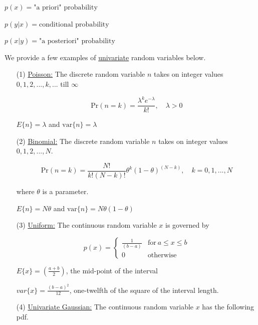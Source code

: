 \documentclass[fleqn]{article}
\begin{document}
	$p(x) = \text{"a priori" probability}$
	
	$p(y|x) = \text{conditional probability}$
	
	$p(x|y) = \text{"a posteriori" probability}$
	
	We provide a few examples of \underline{univariate} random variables below.
	
	\begin{enumerate}
		\item[(1)] \underline{Poisson:} The discrete random variable $n$ takes on integer values \newline $0,1,2,...,k,...$ till $\infty$
		
		\begin{equation*}
			\text{Pr}(n = k) = \frac{\lambda^k e^{-\lambda}}{k!},\quad\lambda > 0
		\end{equation*}
		
		$E\{n\} = \lambda$ and $\text{var}\{n\} = \lambda$
		
		\item[(2)] \underline{Binomial:} The discrete random variable $n$ takes on integer values \newline $0,1,2,...,N$.
		
		\begin{equation*}
			\text{Pr}(n = k) = \frac{N!}{k!(N-k)!}\theta^k(1 - \theta)^{(N - k)}, \quad k = 0,1,...,N
		\end{equation*}
		
		where $\theta$ is a parameter.
		
		$E\{n\} = N\theta$ and $\text{var}\{n\} = N\theta(1-\theta)$
		
		\item[(3)] \underline{Uniform:} The continuous random variable $x$ is governed by
		
		\begin{equation*}
			p(x) = \begin{cases}
				\frac{1}{(b-a)} & \text{for}\ a \leq x \leq b\\
				0 & \text{otherwise}
			\end{cases}
		\end{equation*}
		
		$E\{x\} = \left(\frac{a+b}{2}\right)$, the mid-point of the interval
		
		$var\{x\} = \frac{(b - a)^2}{12}$, one-twelfth of the square of the interval length.
		
		\item[(4)] \underline{Univariate Gaussian:} The continuous random variable $x$ has the following pdf.
		

\end{enumerate}
\end{document}

